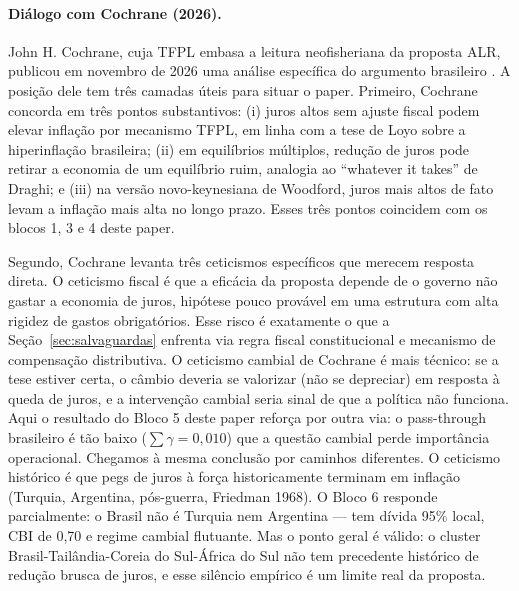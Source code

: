 \documentclass[11pt,a4paper]{article}
\begin{document}
\paragraph{Diálogo com Cochrane (2026).} John H. Cochrane, cuja TFPL
embasa a leitura neofisheriana da proposta ALR, publicou em novembro de
2026 uma análise específica do argumento brasileiro
\cite{cochrane2026brasil}. A posição dele tem três camadas úteis para
situar o paper. Primeiro, Cochrane concorda em três pontos substantivos:
(i) juros altos sem ajuste fiscal podem elevar inflação por mecanismo
TFPL, em linha com a tese de Loyo sobre a hiperinflação brasileira;
(ii) em equilíbrios múltiplos, redução de juros pode retirar a economia
de um equilíbrio ruim, analogia ao ``whatever it takes'' de Draghi; e
(iii) na versão novo-keynesiana de Woodford, juros mais altos de fato
levam a inflação mais alta no longo prazo. Esses três pontos coincidem
com os blocos 1, 3 e 4 deste paper.

Segundo, Cochrane levanta três ceticismos específicos que merecem
resposta direta. O ceticismo fiscal é que a eficácia da proposta depende
de o governo não gastar a economia de juros, hipótese pouco provável em
uma estrutura com alta rigidez de gastos obrigatórios. Esse risco é
exatamente o que a Seção~\ref{sec:salvaguardas} enfrenta via regra
fiscal constitucional e mecanismo de compensação distributiva. O
ceticismo cambial de Cochrane é mais técnico: se a tese estiver certa,
o câmbio deveria se valorizar (não se depreciar) em resposta à queda de
juros, e a intervenção cambial seria sinal de que a política não
funciona. Aqui o resultado do Bloco 5 deste paper reforça por outra
via: o pass-through brasileiro é tão baixo ($\sum \gamma = 0{,}010$)
que a questão cambial perde importância operacional. Chegamos à mesma
conclusão por caminhos diferentes. O ceticismo histórico é que pegs de
juros à força historicamente terminam em inflação (Turquia, Argentina,
pós-guerra, Friedman 1968). O Bloco 6 responde parcialmente: o Brasil
não é Turquia nem Argentina — tem dívida 95\% local, CBI de 0{,}70 e
regime cambial flutuante. Mas o ponto geral é válido: o cluster
Brasil-Tailândia-Coreia do Sul-África do Sul não tem precedente
histórico de redução brusca de juros, e esse silêncio empírico é um
limite real da proposta.
\end{document}
